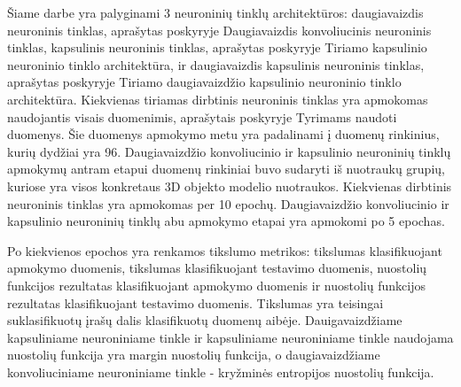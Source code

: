 
Šiame darbe yra palyginami 3 neuroninių tinklų architektūros: daugiavaizdis neuroninis tinklas, aprašytas poskyryje Daugiavaizdis konvoliucinis neuroninis tinklas, kapsulinis neuroninis tinklas, aprašytas poskyryje Tiriamo kapsulinio neuroninio tinklo architektūra, ir daugiavaizdis kapsulinis neuroninis tinklas, aprašytas poskyryje Tiriamo daugiavaizdžio kapsulinio neuroninio tinklo architektūra. Kiekvienas tiriamas dirbtinis neuroninis tinklas yra apmokomas naudojantis visais duomenimis, aprašytais poskyryje Tyrimams naudoti duomenys. Šie duomenys apmokymo metu yra padalinami į duomenų rinkinius, kurių dydžiai yra 96. Daugiavaizdžio konvoliucinio ir kapsulinio neuroninių tinklų apmokymų antram etapui duomenų rinkiniai buvo sudaryti iš nuotraukų grupių, kuriose yra visos konkretaus 3D objekto modelio nuotraukos. Kiekvienas dirbtinis neuroninis tinklas yra apmokomas per 10 epochų. Daugiavaizdžio konvoliucinio ir kapsulinio neuroninių tinklų abu apmokymo etapai yra apmokomi po 5 epochas.

Po kiekvienos epochos yra renkamos tikslumo metrikos: tikslumas klasifikuojant apmokymo duomenis, tikslumas klasifikuojant testavimo duomenis, nuostolių funkcijos rezultatas klasifikuojant apmokymo duomenis ir nuostolių funkcijos rezultatas klasifikuojant testavimo duomenis. Tikslumas yra teisingai suklasifikuotų įrašų dalis klasifikuotų duomenų aibėje. Dauigavaizdžiame kapsuliniame neuroniniame tinkle ir kapsuliniame neuroniniame tinkle naudojama nuostolių funkcija yra margin nuostolių funkcija, o daugiavaizdžiame konvoliuciniame neuroniniame tinkle - kryžminės entropijos nuostolių funkcija.
